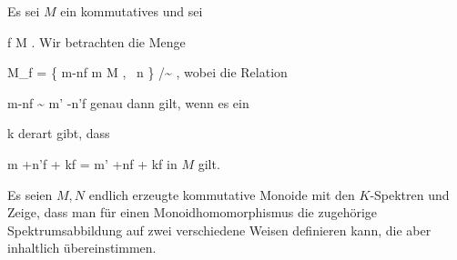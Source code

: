 {}
{





Es sei $M$ ein kommutatives
und sei

\mavergleichskette
{\vergleichskette
{ f
}
{ \in }{ M
}
{  }{
}
{    }{
}
{   }{
}
}
{}{}{.}
Wir betrachten die Menge

\mavergleichskettedisp
{\vergleichskette
{ M_f
}
{ =} { \left\{  m-nf  \mid   m \in M , \,  n \in \N       \right\}  /\sim
}
{ } {
}
{ } {
}
{ } {
}
}
{}{}{,}
wobei die Relation

\mavergleichskettedisp
{\vergleichskette
{ m-nf
}
{ \sim} { m' -n'f
}
{ } {
}
{ } {
}
{ } {
}
}
{}{}{}
genau dann gilt, wenn es ein

\mavergleichskette
{\vergleichskette
{ k
}
{ \in }{ \N
}
{  }{
}
{    }{
}
{   }{
}
}
{}{}{}
derart gibt, dass

\mavergleichskettedisp
{\vergleichskette
{ m +n'f + kf
}
{ =} { m' +nf + kf
}
{ } {
}
{ } {
}
{ } {
}
}
{}{}{}
in $M$ gilt.





}
{} {}

{}
{





Es seien $M,N$ endlich erzeugte kommutative Monoide mit den $K$-Spektren
 und
 Zeige, dass man für einen Monoidhomomorphismus
 die zugehörige Spektrumsabbildung auf zwei verschiedene Weisen definieren kann, die aber inhaltlich übereinstimmen.





}
{} {}

